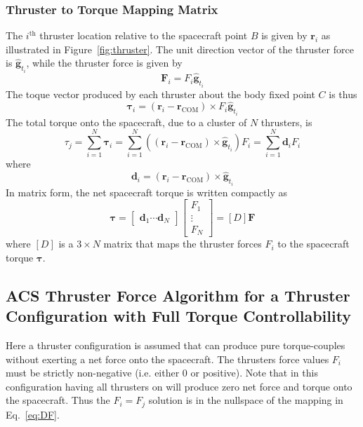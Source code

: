 \subsubsection{Thruster to Torque Mapping Matrix}
The $i^{\text{th}}$ thruster location relative to the spacecraft point $B$ is given by $\bm r_{i}$ as illustrated in Figure~\ref{fig:thruster}.  The unit direction vector of the thruster force is $\hat{\bm g}_{t_{i}}$, while the thruster force is given by
\begin{equation}
	\label{eq:th:1}
	\bm F_{i} = F_{i} \hat{\bm g}_{t_{i}}
\end{equation}
The toque vector produced by each thruster about the body fixed point $C$ is thus
\begin{equation}
	\bm \tau_{i} = (\bm r_{i} - \bm r_{\text{COM}}) \times F_{i}  \hat{\bm g}_{t_{i}}
\end{equation}
The total torque onto the spacecraft, due to a cluster of $N$ thrusters, is
\begin{equation}
	\tau_{j} = \sum_{i=1}^{N} \bm \tau_{i}
	= \sum_{i=1}^{N}  ((\bm r_{i} - \bm r_{\text{COM}}) \times \hat{\bm g}_{t_{i}}) F_{i} = \sum_{i=1}^{N}  \bm d_{i} F_{i}
\end{equation}
where
\begin{equation}
	\label{eq:th1:1}
	\bm d_{i} =    ( \bm r_{i} - \bm r_{\text{COM}})  \times \hat{\bm g}_{t_{i}}
\end{equation}
In matrix form, the net spacecraft torque is written compactly as
\begin{equation}
	\label{eq:DF}
	 \bm\tau = \begin{bmatrix}
		 \bm d_{1} \cdots  \bm d_{N}
	\end{bmatrix} \begin{bmatrix}
		F_{1} \\
		\vdots \\
		F_{N}
	\end{bmatrix} = [D] \bm F
\end{equation}
where $[D]$ is a $3\times N$ matrix that maps the thruster forces $F_{i}$ to the spacecraft torque $\bm \tau$.


\subsection{ACS Thruster Force Algorithm for a Thruster Configuration with Full Torque Controllability}
Here a thruster configuration is assumed that can produce pure torque-couples without exerting a net force onto the spacecraft.  The thrusters force values $F_{i}$ must be strictly non-negative (i.e. either 0 or positive).   Note that in this configuration having all thrusters on will produce zero net force and torque onto the spacecraft.  Thus the $F_{i} = F_{j}$ solution is in the nullspace of the mapping in Eq.~\eqref{eq:DF}.

